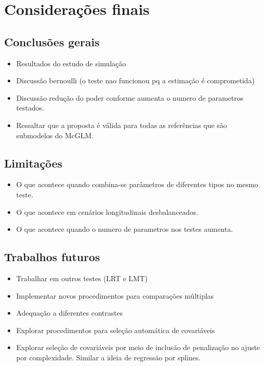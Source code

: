 
\chapter{Considerações finais}


\section{Conclusões gerais}

\begin{itemize}
  \item Resultados do estudo de simulação
  \item Discussão bernoulli (o teste nao funcionou pq a estimação é comprometida)
  \item Discussão redução do poder conforme aumenta o numero de parametros testados.
  \item Ressaltar que a proposta é válida para todas as referências que são submodelos do McGLM.
\end{itemize}


\section{Limitações}

\begin{itemize}
  \item O que acontece quando combina-se parâmetros de diferentes tipos no mesmo teste.
  \item O que acontece em cenários longitudinais desbalanceados.
  \item O que acontece quando o numero de parametros nos testes aumenta.
\end{itemize}


\section{Trabalhos futuros}

\begin{itemize}
  \item Trabalhar em outros testes (LRT e LMT)
  \item Implementar novos procedimentos para comparações múltiplas
  \item Adequação a diferentes contrastes
  \item Explorar procedimentos para seleção automática de covariáveis
  \item Explorar seleção de covariáveis por meio de inclusão de penalização no ajuste por complexidade. Similar a ideia de regressão por splines.
\end{itemize}

